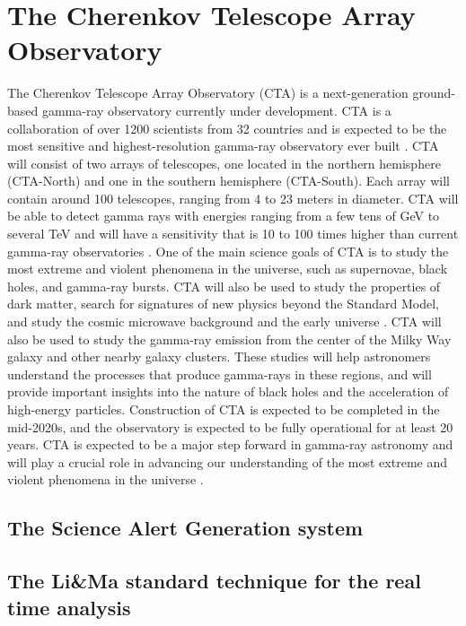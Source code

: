 \section{The Cherenkov Telescope Array Observatory}
\label{CTA}
The Cherenkov Telescope Array Observatory (CTA) is a next-generation ground-based gamma-ray observatory currently under development. CTA is a collaboration of over 1200 scientists from 32 countries and is expected to be the most sensitive and highest-resolution gamma-ray observatory ever built \cite{actis2011design}.
CTA will consist of two arrays of telescopes, one located in the northern hemisphere (CTA-North) and one in the southern hemisphere (CTA-South). Each array will contain around 100 telescopes, ranging from 4 to 23 meters in diameter. CTA will be able to detect gamma rays with energies ranging from a few tens of GeV to several TeV and will have a sensitivity that is 10 to 100 times higher than current gamma-ray observatories \cite{actis2011design}.
One of the main science goals of CTA is to study the most extreme and violent phenomena in the universe, such as supernovae, black holes, and gamma-ray bursts. CTA will also be used to study the properties of dark matter, search for signatures of new physics beyond the Standard Model, and study the cosmic microwave background and the early universe \cite{acharya2013introducing}.
CTA will also be used to study the gamma-ray emission from the center of the Milky Way galaxy and other nearby galaxy clusters. These studies will help astronomers understand the processes that produce gamma-rays in these regions, and will provide important insights into the nature of black holes and the acceleration of high-energy particles.
Construction of CTA is expected to be completed in the mid-2020s, and the observatory is expected to be fully operational for at least 20 years. CTA is expected to be a major step forward in gamma-ray astronomy and will play a crucial role in advancing our understanding of the most extreme and violent phenomena in the universe \cite{the2018cherenkov}.

\subsection{The Science Alert Generation system}

\subsection{The Li&Ma standard technique for the real time analysis}
\label{sb:li-ma}

